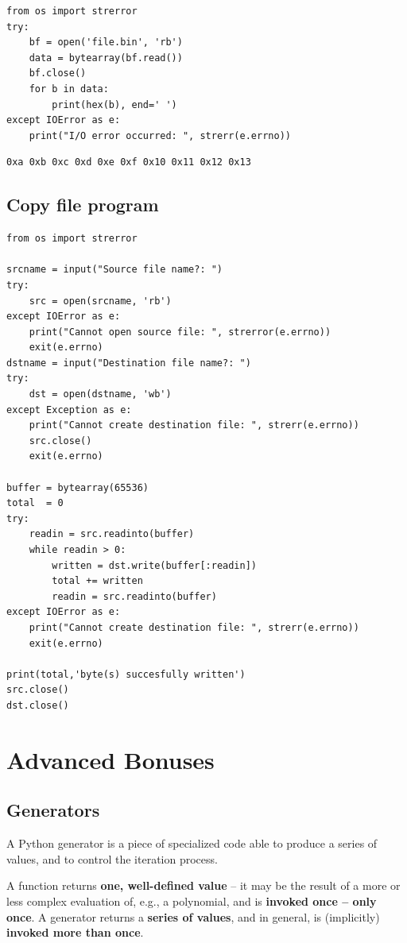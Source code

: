\documentclass[11pt]{article}
\begin{document}
\begin{verbatim}
from os import strerror
try:
	bf = open('file.bin', 'rb')
	data = bytearray(bf.read())
	bf.close()
	for b in data:
		print(hex(b), end=' ')
except IOError as e:
	print("I/O error occurred: ", strerr(e.errno))
\end{verbatim}

\begin{verbatim}
0xa 0xb 0xc 0xd 0xe 0xf 0x10 0x11 0x12 0x13 
\end{verbatim}

\newpage

\subsection{Copy file program}
\label{sec:org589ba83}

\begin{verbatim}
from os import strerror

srcname = input("Source file name?: ")
try:
	src = open(srcname, 'rb')
except IOError as e:
	print("Cannot open source file: ", strerror(e.errno))
	exit(e.errno)	
dstname = input("Destination file name?: ")
try:
	dst = open(dstname, 'wb')
except Exception as e:
	print("Cannot create destination file: ", strerr(e.errno))
	src.close()
	exit(e.errno)	

buffer = bytearray(65536)
total  = 0
try:
	readin = src.readinto(buffer)
	while readin > 0:
		written = dst.write(buffer[:readin])
		total += written
		readin = src.readinto(buffer)
except IOError as e:
	print("Cannot create destination file: ", strerr(e.errno))
	exit(e.errno)	

print(total,'byte(s) succesfully written')
src.close()
dst.close()
\end{verbatim}

\newpage

\section{Advanced Bonuses}
\label{sec:orgd73a3ac}
\subsection{Generators}
\label{sec:org4edbf3b}
A Python generator is a piece of specialized code able to produce a
series of values, and to control the iteration process.

A function returns \textbf{one, well-defined value} – it may be the result of
a more or less complex evaluation of, e.g., a polynomial, and is
\textbf{invoked once – only once}.  A generator returns a \textbf{series of values}, and
in general, is (implicitly) \textbf{invoked more than once}.
\end{document}
